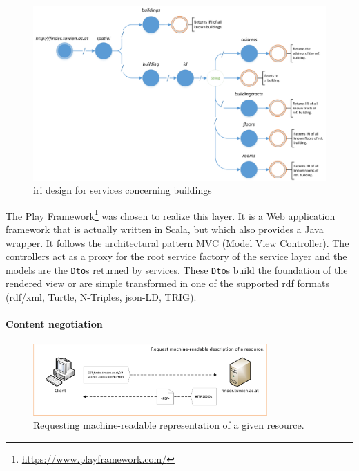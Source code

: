 \documentclass[draft,final]{vutinfth} %
\begin{document}
\begin{figure}[h]
    \centering
    \includegraphics[width=1.0\textwidth]{graphics/buildingApiTree.png}
    \caption{\gls{iri} design for services concerning buildings}
    \label{fig:solution-architectural-prototype:restful-api}
\end{figure}

The Play Framework\footnote{\url{https://www.playframework.com/}} was chosen to realize this layer. It is a Web application framework that is actually written in Scala, but which also provides a Java wrapper. It follows the architectural pattern MVC (Model View Controller). The controllers act as a proxy for the root service factory of the service layer and the models are the \texttt{Dto}s returned by services. These \texttt{Dto}s build the foundation of the rendered view or are simple transformed in one of the supported \gls{rdf} formats (\gls{rdf}/\gls{xml}, Turtle, N-Triples, \gls{json}-LD, TRIG). 

\paragraph{Content negotiation}

\begin{figure}[H]
    \centering
    \includegraphics[width=0.8\textwidth]{graphics/solution/uri-strategy/uriStrategyMachineReadable.png}
    \caption{Requesting machine-readable representation of a given resource.}
    \label{fig:solution-architectural-prototype:ld-publishing:machine-readable}
\end{figure}
\end{document}
